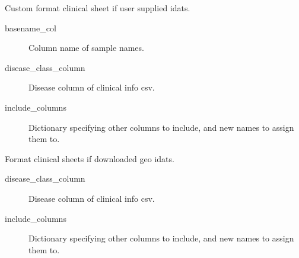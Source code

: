 \documentclass[letterpaper,10pt,english]{sphinxmanual}
\begin{document}
\begin{fulllineitems}
\begin{fulllineitems}
\begin{description}
\end{description}

\end{fulllineitems}


\begin{fulllineitems}
\label{\detokenize{index:pymethylprocess.PreProcessDataTypes.PreProcessPhenoData.format_custom}}
Custom format clinical sheet if user supplied idats.
\begin{description}
\item[{basename\_col}] \leavevmode
Column name of sample names.

\item[{disease\_class\_column}] \leavevmode
Disease column of clinical info csv.

\item[{include\_columns}] \leavevmode
Dictionary specifying other columns to include, and new names to assign them to.

\end{description}

\end{fulllineitems}


\begin{fulllineitems}
\label{\detokenize{index:pymethylprocess.PreProcessDataTypes.PreProcessPhenoData.format_geo}}
Format clinical sheets if downloaded geo idats.
\begin{description}
\item[{disease\_class\_column}] \leavevmode
Disease column of clinical info csv.

\item[{include\_columns}] \leavevmode
Dictionary specifying other columns to include, and new names to assign them to.

\end{description}


\end{fulllineitems}
\end{fulllineitems}
\end{document}
